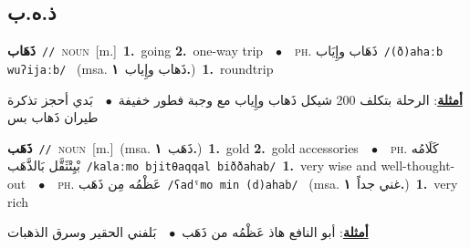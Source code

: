 \documentclass[10pt,a4paper,twoside]{article} %
\begin{document}
\begin{multicols}{2}
{{{{{{{\vspace{-3mm}
\subsection*{\color{blue}\foreignlanguage{arabic}{ذ.ه.ب}\color{blue}{}} 

{\setlength\topsep{0pt}\textbf{\foreignlanguage{arabic}{ذَهَاب}}\ {\color{gray}\texttt{//}\color{black}}\ \textsc{noun}\ [m.]\ \textbf{1.}~going  \textbf{2.}~one-way trip\ \ $\bullet$\ \ \textsc{ph.} \color{gray} \foreignlanguage{arabic}{ذَهَاب وإِيَاب}\color{black}\ {\color{gray}\texttt{/{\sffamily (ð)ahaːb wuʔijaːb}/}\color{black}}\ \color{gray} (msa. \foreignlanguage{arabic}{ذَهاب وإِياب}~\foreignlanguage{arabic}{\textbf{١.}})\color{black}\ \textbf{1.}~roundtrip\  \begin{flushright}\color{gray}\foreignlanguage{arabic}{\textbf{\underline{\foreignlanguage{arabic}{أمثلة}}}: الرحلة بتكلف 200 شيكل ذَهاب وإِياب مع وجبة فطور خفيفة\ $\bullet$\ \  بَدي أحجز تذكرة طيران ذَهاب بس}\end{flushright}\color{black}} \vspace{2mm}

{\setlength\topsep{0pt}\textbf{\foreignlanguage{arabic}{ذَهَب}}\ {\color{gray}\texttt{//}\color{black}}\ \textsc{noun}\ [m.]\ \color{gray}(msa. \foreignlanguage{arabic}{ذَهَب}~\foreignlanguage{arabic}{\textbf{١.}})\color{black}\ \textbf{1.}~gold  \textbf{2.}~gold accessories\ \ $\bullet$\ \ \textsc{ph.} \color{gray} \foreignlanguage{arabic}{كَلَامُه بْيِتْثَقَّل بَالذَّهَب}\color{black}\ {\color{gray}\texttt{/{\sffamily kalaːmo bjitθaqqal biððahab}/}\color{black}}\ \textbf{1.}~very wise and well-thought-out\ \ $\bullet$\ \ \textsc{ph.} \color{gray} \foreignlanguage{arabic}{عَظْمُه مِن ذَهَب}\color{black}\ {\color{gray}\texttt{/{\sffamily ʕadˤmo min (d)ahab}/}\color{black}}\ \color{gray} (msa. \foreignlanguage{arabic}{غني جداً}~\foreignlanguage{arabic}{\textbf{١.}})\color{black}\ \textbf{1.}~very rich\  \begin{flushright}\color{gray}\foreignlanguage{arabic}{\textbf{\underline{\foreignlanguage{arabic}{أمثلة}}}: أبو النافع هاذ عَظْمُه من ذَهَب\ $\bullet$\ \  بَلفني الحقير وسرق الذهبات}\end{flushright}\color{black}} \vspace{2mm}

}}}}}}}
\end{multicols}
\end{document}
